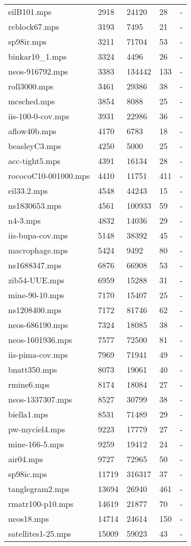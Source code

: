 \documentclass{article}
\begin{document}
\begin{longtable}{|l |l |l |l |l |}
eilB101.mps&2918&24120&28&-\\
reblock67.mps&3193&7495&21&-\\
sp98ir.mps&3211&71704&53&-\\
binkar10_1.mps&3324&4496&26&-\\
neos-916792.mps&3383&134442&133&-\\
roll3000.mps&3461&29386&38&-\\
mcsched.mps&3854&8088&25&-\\
iis-100-0-cov.mps&3931&22986&36&-\\
aflow40b.mps&4170&6783&18&-\\
beasleyC3.mps&4250&5000&25&-\\
acc-tight5.mps&4391&16134&28&-\\
rococoC10-001000.mps&4410&11751&411&-\\
eil33.2.mps&4548&44243&15&-\\
ns1830653.mps&4561&100933&59&-\\
n4-3.mps&4832&14036&29&-\\
iis-bupa-cov.mps&5148&38392&45&-\\
macrophage.mps&5424&9492&80&-\\
ns1688347.mps&6876&66908&53&-\\
zib54-UUE.mps&6959&15288&31&-\\
mine-90-10.mps&7170&15407&25&-\\
ns1208400.mps&7172&81746&62&-\\
neos-686190.mps&7324&18085&38&-\\
neos-1601936.mps&7577&72500&81&-\\
iis-pima-cov.mps&7969&71941&49&-\\
bnatt350.mps&8073&19061&40&-\\
rmine6.mps&8174&18084&27&-\\
neos-1337307.mps&8527&30799&38&-\\
biella1.mps&8531&71489&29&-\\
pw-myciel4.mps&9223&17779&27&-\\
mine-166-5.mps&9259&19412&24&-\\
air04.mps&9727&72965&50&-\\
sp98ic.mps&11719&316317&37&-\\
tanglegram2.mps&13694&26940&461&-\\
rmatr100-p10.mps&14619&21877&70&-\\
neos18.mps&14714&24614&150&-\\
satellites1-25.mps&15009&59023&43&-\\

\end{longtable}
\end{document}
